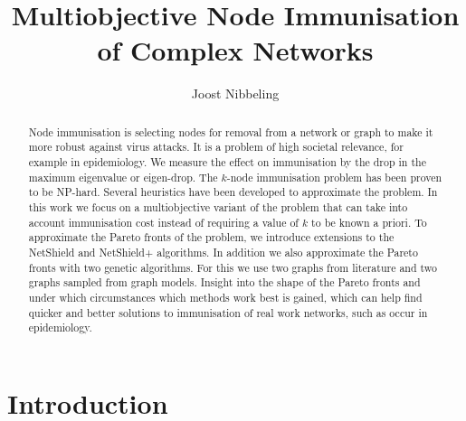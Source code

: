 \documentclass{svproc}
\begin{document}
\mainmatter              %
%
\title{Multiobjective Node Immunisation of Complex Networks}
%
%
\author{Joost Nibbeling}
%
%
%

\maketitle              %

\begin{abstract}
Node immunisation is selecting nodes for removal from a network or graph to make it more robust against virus attacks. It is a problem of high societal relevance, for example in epidemiology. We measure the effect on immunisation by the drop in the maximum eigenvalue or eigen-drop. The $k$-node immunisation problem  has been proven to be NP-hard. Several heuristics have been developed to approximate the problem. In this work we  focus on a multiobjective variant of the problem that can take into account immunisation cost instead of requiring a value of $k$ to be known a priori. To approximate the Pareto fronts of the problem, we introduce extensions to  the NetShield and NetShield+ algorithms. In addition we also approximate the Pareto fronts with two genetic algorithms. For this we use two graphs from literature and two graphs sampled from graph models. Insight into the shape of the Pareto fronts and under which circumstances which methods work best is gained, which can help find quicker and better solutions to immunisation of real work networks, such as occur in epidemiology.

\end{abstract}
%
\section{Introduction}
%
\end{document}
